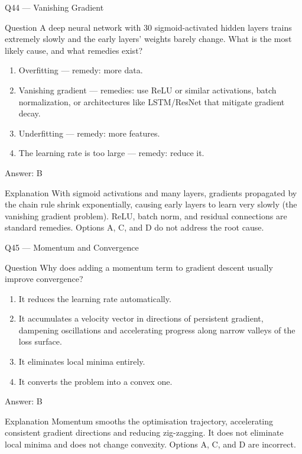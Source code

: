 \documentclass[aspectratio=169,8pt]{beamer}
\begin{document}
	\begin{frame}{Q44 --- Vanishing Gradient}
		\begin{block}{Question}
			A deep neural network with 30 sigmoid-activated hidden layers trains extremely slowly and the early layers' weights barely change. What is the most likely cause, and what remedies exist?
		\end{block}
		\begin{enumerate}
			\item Overfitting --- remedy: more data.
			\item Vanishing gradient --- remedies: use ReLU or similar activations, batch normalization, or architectures like LSTM/ResNet that mitigate gradient decay.
			\item Underfitting --- remedy: more features.
			\item The learning rate is too large --- remedy: reduce it.
		\end{enumerate}
		\begin{exampleblock}{Answer: B}\end{exampleblock}
		\begin{block}{Explanation}
			With sigmoid activations and many layers, gradients propagated by the chain rule shrink exponentially, causing early layers to learn very slowly (the vanishing gradient problem). ReLU, batch norm, and residual connections are standard remedies. Options A, C, and D do not address the root cause.
		\end{block}
	\end{frame}
	
	\begin{frame}{Q45 --- Momentum and Convergence}
		\begin{block}{Question}
			Why does adding a momentum term to gradient descent usually improve convergence?
		\end{block}
		\begin{enumerate}
			\item It reduces the learning rate automatically.
			\item It accumulates a velocity vector in directions of persistent gradient, dampening oscillations and accelerating progress along narrow valleys of the loss surface.
			\item It eliminates local minima entirely.
			\item It converts the problem into a convex one.
		\end{enumerate}
		\begin{exampleblock}{Answer: B}\end{exampleblock}
		\begin{block}{Explanation}
			Momentum smooths the optimisation trajectory, accelerating consistent gradient directions and reducing zig-zagging. It does not eliminate local minima and does not change convexity. Options A, C, and D are incorrect.
		\end{block}
	\end{frame}
	
\end{document}
